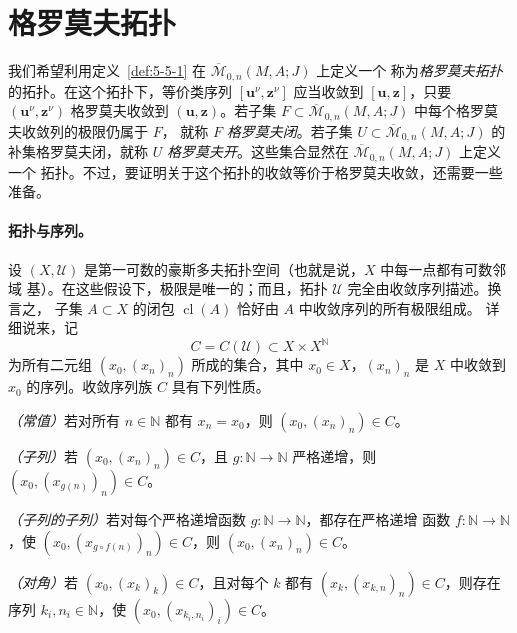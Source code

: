 
\section{格罗莫夫拓扑}\label{sec:5-6}

我们希望利用定义~\ref{def:5-5-1} 在 $\overline{\mathcal M}_{0,n}(M,A;J)$ 上定义一个
称为\emph{格罗莫夫拓扑}的拓扑。在这个拓扑下，等价类序列
$[\mathbf u^\nu,\mathbf z^\nu]$ 应当收敛到 $[\mathbf u,\mathbf z]$，只要
$(\mathbf u^\nu,\mathbf z^\nu)$ 格罗莫夫收敛到 $(\mathbf u,\mathbf z)$。若子集
$F\subset\overline{\mathcal M}_{0,n}(M,A;J)$ 中每个格罗莫夫收敛列的极限仍属于 $F$，
就称 $F$ \emph{格罗莫夫闭}。若子集
$U\subset\overline{\mathcal M}_{0,n}(M,A;J)$ 的补集格罗莫夫闭，就称 $U$
\emph{格罗莫夫开}。这些集合显然在 $\overline{\mathcal M}_{0,n}(M,A;J)$ 上定义一个
拓扑。不过，要证明关于这个拓扑的收敛等价于格罗莫夫收敛，还需要一些准备。

\paragraph{拓扑与序列。}
设 $(X,\mathcal U)$ 是第一可数的豪斯多夫拓扑空间（也就是说，$X$ 中每一点都有可数邻域
基）。在这些假设下，极限是唯一的；而且，拓扑 $\mathcal U$ 完全由收敛序列描述。换言之，
子集 $A\subset X$ 的闭包 $\operatorname{cl}(A)$ 恰好由 $A$ 中收敛序列的所有极限组成。
详细说来，记
\[
  C=C(\mathcal U)\subset X\times X^{\mathbb N}
\]
为所有二元组 $(x_0,(x_n)_n)$ 所成的集合，其中 $x_0\in X$，$(x_n)_n$ 是 $X$ 中收敛到
$x_0$ 的序列。收敛序列族 $C$ 具有下列性质。

\emph{（常值）}若对所有 $n\in\mathbb N$ 都有 $x_n=x_0$，则
$(x_0,(x_n)_n)\in C$。

\emph{（子列）}若 $(x_0,(x_n)_n)\in C$，且 $g:\mathbb N\to\mathbb N$ 严格递增，则
$(x_0,(x_{g(n)})_n)\in C$。

\emph{（子列的子列）}若对每个严格递增函数 $g:\mathbb N\to\mathbb N$，都存在严格递增
函数 $f:\mathbb N\to\mathbb N$，使 $(x_0,(x_{g\circ f(n)})_n)\in C$，则
$(x_0,(x_n)_n)\in C$。

\emph{（对角）}若 $(x_0,(x_k)_k)\in C$，且对每个 $k$ 都有
$(x_k,(x_{k,n})_n)\in C$，则存在序列 $k_i,n_i\in\mathbb N$，使
$(x_0,(x_{k_i,n_i})_i)\in C$。

